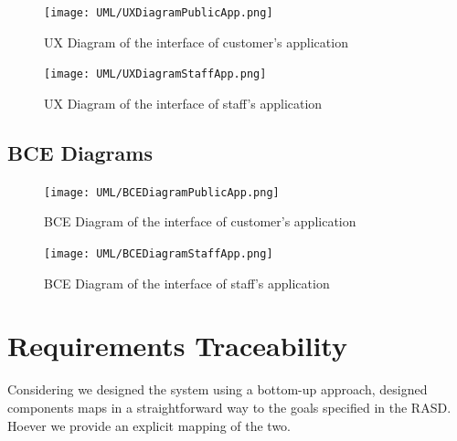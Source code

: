 \documentclass[11pt]{article} %
\begin{document}
\begin{figure}[H]
	\centering
	\texttt{[image: UML/UXDiagramPublicApp.png]}
	\caption{UX Diagram of the interface of customer's application}
\end{figure}

\begin{figure}[H]
	\centering
	\texttt{[image: UML/UXDiagramStaffApp.png]}
	\caption{UX Diagram of the interface of staff's application}
\end{figure}	

\subsection{BCE Diagrams}

\begin{figure}[H]
	\centering
	\texttt{[image: UML/BCEDiagramPublicApp.png]}
	\caption{BCE Diagram of the interface of customer's application}
\end{figure}	

\begin{figure}[H]
	\centering
	\texttt{[image: UML/BCEDiagramStaffApp.png]}
	\caption{BCE Diagram of the interface of staff's application}
\end{figure}	
	

\newpage
\section{Requirements Traceability}

Considering we designed the system using a bottom-up approach, designed components maps in a straightforward way to the goals specified in the RASD. Hoever we provide an explicit mapping of the two.
\end{document}
